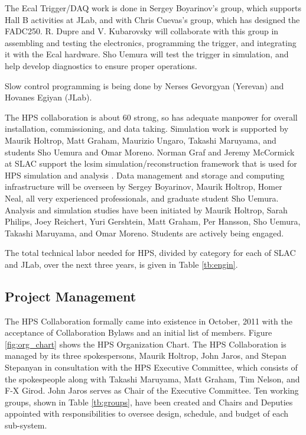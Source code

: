 The Ecal Trigger/DAQ work is done in Sergey Boyarinov's group, which supports Hall B activities at JLab, and with Chris Cuevas's group, which has designed the FADC250.
R. Dupre and  V. Kubarovsky will collaborate with this group in assembling and testing the electronics, programming the trigger, and integrating it with 
the Ecal hardware. Sho Uemura will test the trigger in simulation, and help develop diagnostics to ensure proper operations.

Slow control programming is being done by Nerses Gevorgyan (Yerevan) and Hovanes Egiyan (JLab).

The HPS collaboration is about 60 strong, so has adequate manpower for overall installation, commissioning, and data taking. Simulation work is supported by Maurik Holtrop, 
Matt Graham, Maurizio Ungaro, Takashi Maruyama, and students Sho Uemura and Omar Moreno. Norman Graf and Jeremy McCormick at SLAC support the lcsim 
simulation/reconstruction framework that is used for HPS simulation and analysis . Data management and storage and computing infrastructure will be overseen by 
Sergey Boyarinov, Maurik Holtrop, Homer Neal, all very experienced professionals, and graduate student Sho Uemura. Analysis and simulation studies have been 
initiated by Maurik Holtrop, Sarah Philips, Joey Reichert, Yuri Gershtein, Matt Graham, Per Hansson, Sho Uemura, Takashi Maruyama, and Omar Moreno. 
Students are actively being engaged.

The total technical labor needed for HPS, divided by category for each of SLAC and JLab, over the next three years, is given in Table \ref{tb:engin}.


\subsection{Project Management}

The HPS Collaboration formally came into existence in October, 2011 with the acceptance of Collaboration Bylaws and an initial list of members.
Figure \ref{fig:org_chart} shows the HPS Organization Chart. The HPS Collaboration is managed by its three spokespersons, Maurik Holtrop, John Jaros, and 
Stepan Stepanyan in consultation with the HPS Executive Committee, 
which consists of the spokespeople along with Takashi Maruyama, Matt Graham, Tim Nelson, and F-X Girod. John Jaros serves as Chair of the Executive Committee. 
Ten working groups, shown in Table \ref{tb:groups}, have been created and Chairs and Deputies appointed with responsibilities 
to oversee design, schedule, and budget of each sub-system. 

